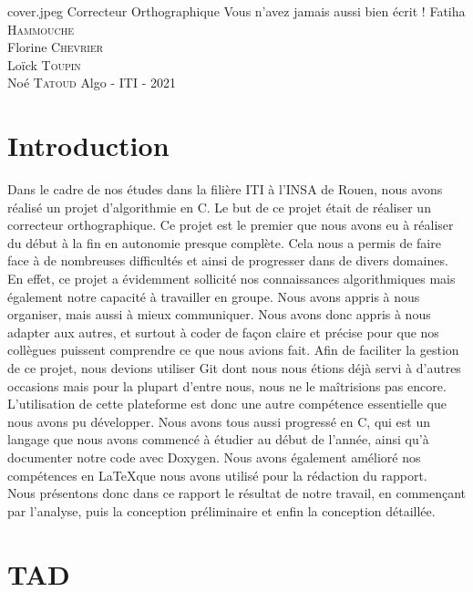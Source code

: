 \documentclass{article}
\begin{document}
\PageDeGarde	
{cover.jpeg} %
{Correcteur Orthographique} %
{Vous n'avez jamais aussi bien écrit !} %
{Fatiha \textsc{Hammouche} \\
Florine \textsc{Chevrier} \\
Loïck \textsc{Toupin} \\
Noé \textsc{Tatoud}}
{Algo - ITI - 2021} %


\tableofcontents

\clearpage
\section{Introduction}
Dans le cadre de nos études dans la filière ITI à l’INSA de Rouen, nous avons réalisé un projet d’algorithmie en C. Le but de ce projet était de réaliser un correcteur orthographique. Ce projet est le premier que nous avons eu à réaliser du début à la fin en autonomie presque complète. Cela nous a permis de faire face à de nombreuses difficultés et ainsi de progresser dans de divers domaines. \\
En effet, ce projet a évidemment sollicité nos connaissances algorithmiques mais également notre capacité à travailler en groupe. Nous avons appris à nous organiser, mais aussi à mieux communiquer. Nous avons donc appris à nous adapter aux autres, et surtout à coder de façon claire et précise pour que nos collègues puissent comprendre ce que nous avions fait. Afin de faciliter la gestion de ce projet, nous devions utiliser Git dont nous nous étions déjà servi à d’autres occasions mais pour la plupart d’entre nous, nous ne le maîtrisions pas encore. L’utilisation de cette plateforme est donc une autre compétence essentielle que nous avons pu développer. Nous avons tous aussi progressé en C, qui est un langage que nous avons commencé à étudier au début de l’année, ainsi qu’à documenter notre code avec Doxygen. Nous avons également amélioré nos compétences en \LaTeX que nous avons utilisé pour la rédaction du rapport. \\
Nous présentons donc dans ce rapport le résultat de notre travail, en commençant par l'analyse, puis la conception préliminaire et enfin la conception détaillée.

\clearpage
\section{TAD}
	
	\clearpage
	
	\clearpage
	
	\clearpage
	
\end{document}
